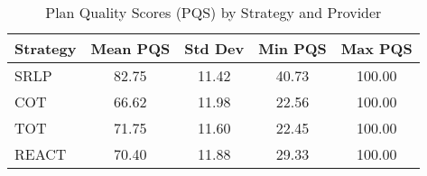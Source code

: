 \begin{table}[htbp]
\centering
\caption{Plan Quality Scores (PQS) by Strategy and Provider}
\label{tab:pqs_by_strategy}
\begin{tabular}{lcccc}
\toprule
Strategy & Mean PQS & Std Dev & Min PQS & Max PQS \\
\midrule
SRLP & 82.75 & 11.42 & 40.73 & 100.00 \\
COT & 66.62 & 11.98 & 22.56 & 100.00 \\
TOT & 71.75 & 11.60 & 22.45 & 100.00 \\
REACT & 70.40 & 11.88 & 29.33 & 100.00 \\
\bottomrule
\end{tabular}
\end{table}